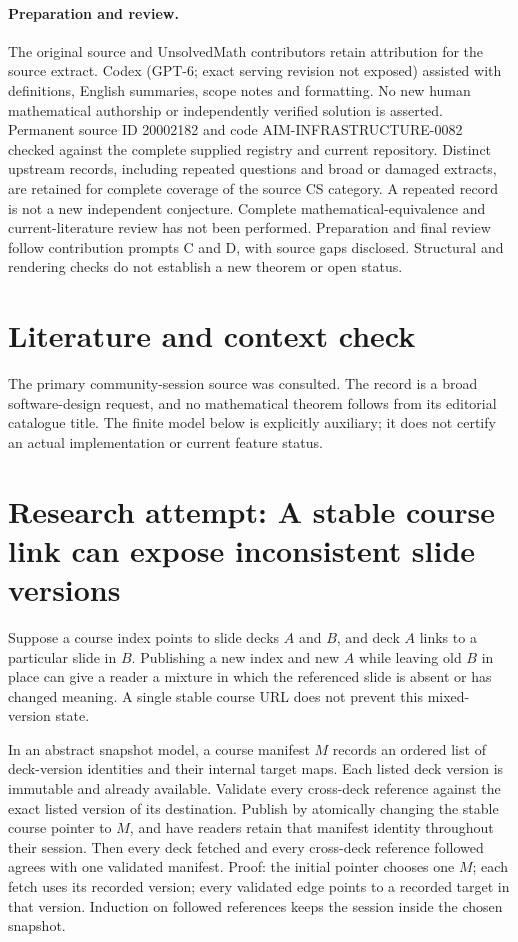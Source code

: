 \documentclass[11pt]{article}
\begin{document}
\paragraph{Preparation and review.}
The original source and UnsolvedMath contributors retain attribution for the source extract. Codex (GPT-6; exact serving revision not exposed) assisted with definitions, English summaries, scope notes and formatting. No new human mathematical authorship or independently verified solution is asserted. Permanent source ID 20002182 and code AIM-INFRASTRUCTURE-0082 checked against the complete supplied registry and current repository. Distinct upstream records, including repeated questions and broad or damaged extracts, are retained for complete coverage of the source CS category. A repeated record is not a new independent conjecture. Complete mathematical-equivalence and current-literature review has not been performed. Preparation and final review follow contribution prompts C and D, with source gaps disclosed. Structural and rendering checks do not establish a new theorem or open status.
\label{end:20002182}

\section{Literature and context check}
The primary community-session source was consulted. The record is a broad software-design request, and no mathematical theorem follows from its editorial catalogue title. The finite model below is explicitly auxiliary; it does not certify an actual implementation or current feature status.
\section{Research attempt: A stable course link can expose inconsistent slide versions}
Suppose a course index points to slide decks $A$ and $B$, and deck $A$ links to a particular slide in $B$. Publishing a new index and new $A$ while leaving old $B$ in place can give a reader a mixture in which the referenced slide is absent or has changed meaning. A single stable course URL does not prevent this mixed-version state.

In an abstract snapshot model, a course manifest $M$ records an ordered list of deck-version identities and their internal target maps. Each listed deck version is immutable and already available. Validate every cross-deck reference against the exact listed version of its destination. Publish by atomically changing the stable course pointer to $M$, and have readers retain that manifest identity throughout their session. Then every deck fetched and every cross-deck reference followed agrees with one validated manifest. Proof: the initial pointer chooses one $M$; each fetch uses its recorded version; every validated edge points to a recorded target in that version. Induction on followed references keeps the session inside the chosen snapshot.
\end{document}
